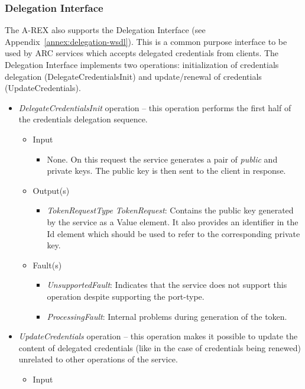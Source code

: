 \documentclass{article}                            %
\begin{document}
\subsubsection{Delegation Interface}

The A-REX also supports the Delegation Interface (see Appendix~\ref{annex:delegation-wsdl}).
This is a common purpose interface to be used by ARC services which
accepts delegated credentials from clients. The Delegation Interface
implements two operations: initialization of credentials delegation
(DelegateCredentialsInit) and update/renewal of credentials (UpdateCredentials).

\begin{itemize}
\item \emph{DelegateCredentialsInit} operation -- this operation performs
the first half of the credentials delegation sequence.
\begin{itemize}
\item Input
\begin{itemize}
\item None. On this request the service generates a pair of \emph{public}
and private keys. The public key is then sent to the client in response.
\end{itemize}
\item Output(s)
\begin{itemize}
\item \emph{TokenRequestType TokenRequest}: Contains the public key generated
by the service as a Value element. It also provides an identifier
in the Id element which should be used to refer to the corresponding
private key.
\end{itemize}
\item Fault(s)
\begin{itemize}
\item \emph{UnsupportedFault}: Indicates that the service does not support
this operation despite supporting the port-type.
\item \emph{ProcessingFault}: Internal problems during generation of the
token.
\end{itemize}
\end{itemize}
\item \emph{UpdateCredentials} operation -- this operation makes it possible
to update the content of delegated credentials (like in the case of
credentials being renewed) unrelated to other operations of the service.
\begin{itemize}
\item Input
\begin{itemize}

\end{itemize}
\end{itemize}
\end{itemize}
\end{document}
